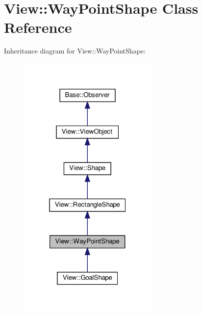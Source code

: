 \hypertarget{class_view_1_1_way_point_shape}{}\section{View\+:\+:Way\+Point\+Shape Class Reference}
\label{class_view_1_1_way_point_shape}


Inheritance diagram for View\+:\+:Way\+Point\+Shape\+:
\nopagebreak
\begin{figure}[H]
\begin{center}
\leavevmode
\includegraphics[width=196pt]{class_view_1_1_way_point_shape__inherit__graph}
\end{center}
\end{figure}


